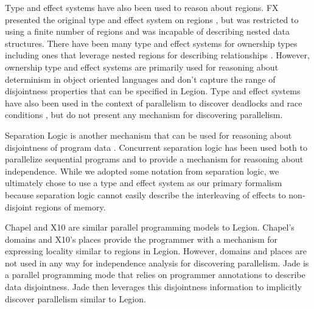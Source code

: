 Type and effect systems have also been used to reason about regions.  FX presented
the original type and effect system on regions \cite{Lucassen88}, but was restricted 
to using a finite number of regions and was incapable of describing nested data
structures.  There have been many type and effect systems for ownership types
\cite{Boyapati03} including ones that leverage nested regions for describing
relationships \cite{Clarke02,Cameron07}.  However, ownership type and effect systems
are primarily used for reasoning about determinism in object oriented languages and
don't capture the range of disjointness properties that can be specified in Legion.
Type and effect systems have also been used in the context of parallelism to discover
deadlocks and race conditions \cite{Boyapati02,Abadi06,Jacobs08}, but do not present 
any mechanism for discovering parallelism.

Separation Logic is another mechanism that can be used for reasoning about disjointness
of program data \cite{Reynolds02}.  Concurrent separation logic\cite{Brookes04} has been 
used both to parallelize sequential programs\cite{Raza09,Gotsman07} and to provide 
a mechanism for reasoning about independence\cite{Hayman06}.
While we adopted some notation from separation logic, we ultimately chose to use a 
type and effect system as our primary formalism because separation logic cannot easily 
describe the interleaving of effects to non-disjoint regions of memory.

Chapel \cite{Chamberlain:Chapel} and X10 \cite{X1005} are similar parallel programming
models to Legion.  Chapel's domains and X10's places provide the programmer with a 
mechanism for expressing locality similar to regions in Legion.  However, domains
and places are not used in any way for independence analysis for discovering parallelism.
Jade is a parallel programming mode that relies on programmer annotations to describe
data disjointness\cite{Rinard98}.  Jade then leverages this disjointness information
to implicitly discover parallelism similar to Legion.

